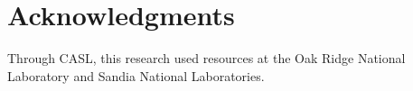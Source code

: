 \documentclass{mc2015}
\begin{document}
\section{Acknowledgments}

Through CASL, this research used resources at the Oak Ridge National Laboratory
and Sandia National Laboratories.

\setlength{\baselineskip}{12pt}





\end{document}
